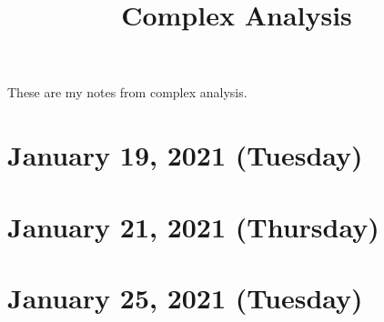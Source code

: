 \documentclass{pranav}
\title{Complex Analysis}
\begin{document}
\maketitle 
These are my notes from complex analysis. 
\tableofcontents

\newpage


\section{January 19, 2021 (Tuesday)}


\section{January 21, 2021 (Thursday)}


\section{January 25, 2021 (Tuesday)}

\end{document}
